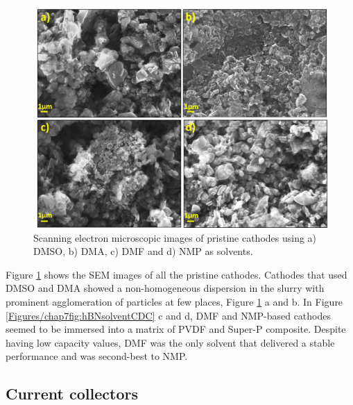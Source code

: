 \begin{figure}[h!]
\centering
\includegraphics[width=\textwidth]{Figures/chap7fig/hBNsolventSEM}
\caption{Scanning electron microscopic images of pristine cathodes using a) DMSO, b) DMA, c) DMF and d) NMP as solvents.}
\label{Figures/chap7fig:hBNsolventSEM}
\end{figure}

Figure \ref{Figures/chap7fig:hBNsolventSEM} shows the SEM images of all the pristine cathodes. Cathodes that used DMSO and DMA showed a non-homogeneous dispersion in the slurry with prominent agglomeration of particles at few places, Figure \ref{Figures/chap7fig:hBNsolventSEM} a and b. In Figure \ref{Figures/chap7fig:hBNsolventCDC} c and d, DMF and NMP-based cathodes seemed to be immersed into a matrix of PVDF and Super-P composite. Despite having low capacity values, DMF was the only solvent that delivered a stable performance and was second-best to NMP. \\

\subsection*{Current collectors}

